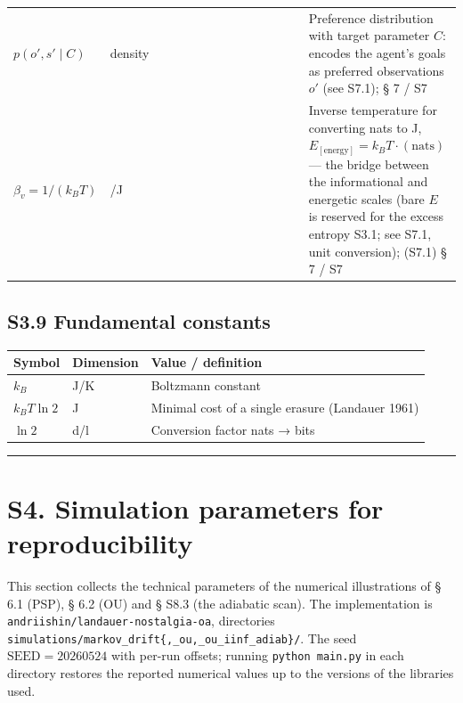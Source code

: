 \documentclass[pdflatex,sn-mathphys-ay]{sn-jnl}
\begin{document}
\begin{center}
\begin{tabular}{@{} >{\raggedright\arraybackslash}p{0.2105\linewidth} >{\raggedright\arraybackslash}p{0.4474\linewidth} >{\raggedright\arraybackslash}p{0.3421\linewidth}@{}}
\(p(o', s' \mid C)\) & density & Preference distribution with target parameter \(C\): encodes the agent's goals as preferred observations \(o'\) (see S7.1); § 7 / S7 \\

\(\beta_v = 1/(k_B T)\) & 1/J & Inverse temperature for converting nats to J, \(E_{[\text{energy}]} = k_B T \cdot (\text{nats})\) --- the bridge between the informational and energetic scales (bare \(E\) is reserved for the excess entropy S3.1; see S7.1, unit conversion); (S7.1) § 7 / S7 \\

\bottomrule
\end{tabular}
\end{center}


\subsection*{S3.9 Fundamental constants}\label{s3.9-fundamental-constants}



\begin{center}\small
\begin{tabular}{@{}lll@{}}
\toprule

Symbol & Dimension & Value / definition \\

\midrule

\(k_B\) & J/K & Boltzmann constant \\

\(k_B T \ln 2\) & J & Minimal cost of a single erasure (Landauer 1961) \\

\(\ln 2\) & d/l & Conversion factor nats → bits \\

\bottomrule
\end{tabular}
\end{center}


\begin{center}\rule{0.5\linewidth}{0.5pt}\end{center}



\section*{S4. Simulation parameters for reproducibility}\label{s4.-simulation-parameters-for-reproducibility}



This section collects the technical parameters of the numerical illustrations of § 6.1 (PSP), § 6.2 (OU) and § S8.3 (the adiabatic scan). The implementation is \texttt{andriishin/landauer-nostalgia-oa}, directories \texttt{simulations/markov\_drift\{,\_ou,\_ou\_iinf\_adiab\}/}. The seed \(\text{SEED} = 20260524\) with per-run offsets; running \texttt{python\ main.py} in each directory restores the reported numerical values up to the versions of the libraries used.
\end{document}
